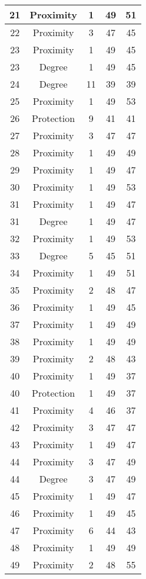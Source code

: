 \documentclass[results.tex]{subfiles}
\begin{document}
\begin{center}
\begin{tabular}{| c || c | c | c | c |}
    \hline
    21 & Proximity & 1 & 49 & 51 \\ 
    \hline
    22 & Proximity & 3 & 47 & 45 \\ 
    \hline
    23 & Proximity & 1 & 49 & 45 \\ 
    \hline
    23 & Degree & 1 & 49 & 45 \\ 
    \hline
    24 & Degree & 11 & 39 & 39 \\ 
    \hline
    25 & Proximity & 1 & 49 & 53 \\ 
    \hline
    26 & Protection & 9 & 41 & 41 \\ 
    \hline
    27 & Proximity & 3 & 47 & 47 \\ 
    \hline
    28 & Proximity & 1 & 49 & 49 \\ 
    \hline
    29 & Proximity & 1 & 49 & 47 \\ 
    \hline
    30 & Proximity & 1 & 49 & 53 \\ 
    \hline
    31 & Proximity & 1 & 49 & 47 \\ 
    \hline
    31 & Degree & 1 & 49 & 47 \\ 
    \hline
    32 & Proximity & 1 & 49 & 53 \\ 
    \hline
    33 & Degree & 5 & 45 & 51 \\ 
    \hline
    34 & Proximity & 1 & 49 & 51 \\ 
    \hline
    35 & Proximity & 2 & 48 & 47 \\ 
    \hline
    36 & Proximity & 1 & 49 & 45 \\ 
    \hline
    37 & Proximity & 1 & 49 & 49 \\ 
    \hline
    38 & Proximity & 1 & 49 & 49 \\ 
    \hline
    39 & Proximity & 2 & 48 & 43 \\ 
    \hline
    40 & Proximity & 1 & 49 & 37 \\ 
    \hline
    40 & Protection & 1 & 49 & 37 \\ 
    \hline
    41 & Proximity & 4 & 46 & 37 \\ 
    \hline
    42 & Proximity & 3 & 47 & 47 \\ 
    \hline
    43 & Proximity & 1 & 49 & 47 \\ 
    \hline
    44 & Proximity & 3 & 47 & 49 \\ 
    \hline
    44 & Degree & 3 & 47 & 49 \\ 
    \hline
    45 & Proximity & 1 & 49 & 47 \\ 
    \hline
    46 & Proximity & 1 & 49 & 45 \\ 
    \hline
    47 & Proximity & 6 & 44 & 43 \\ 
    \hline
    48 & Proximity & 1 & 49 & 49 \\ 
    \hline
    49 & Proximity & 2 & 48 & 55 \\ 
    \hline   \end{tabular}
\end{center}
\end{document}
